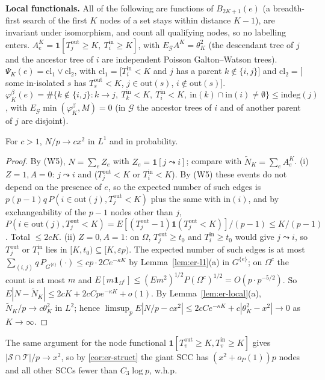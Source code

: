 \textbf{Local functionals.} All of the following are functions of $B_{2K+1}(e)$
(a breadth-first search of the first $K$ nodes of a set stays within distance
$K-1$), are invariant under isomorphism, and count all qualifying nodes, so no
labelling enters.
$A^K_e=\mathbf 1[T^{\mathrm{out}}_j\ge K,\ T^{\mathrm{in}}_i\ge K]$, with
$E_{\mathcal G}A^K=\theta_K^2$ (the descendant tree of $j$ and the ancestor tree
of $i$ are independent Poisson Galton--Watson trees).
$\Psi_K(e)=\mathrm{cl}_1\vee\mathrm{cl}_2$, with
$\mathrm{cl}_1=[T^{\mathrm{in}}_i<K$ and $j$ has a parent $k\notin\{i,j\}]$ and
$\mathrm{cl}_2=[$some in-isolated $s$ has $T^{\mathrm{out}}_s<K$, $j\in\mathrm{out}(s)$, $i\notin\mathrm{out}(s)]$.
$\varphi^{\beta}_K(e)=\#\{k\notin\{i,j\}:k\to j,\ T^{\mathrm{in}}_k<K,\ T^{\mathrm{in}}_i<K,\ \mathrm{in}(k)\cap\mathrm{in}(i)\ne\emptyset\}\le\mathrm{indeg}(j)$,
with $E_{\mathcal G}\min(\varphi^\beta_K,M)=0$ (in $\mathcal G$ the ancestor trees
of $i$ and of another parent of $j$ are disjoint).

\begin{proposition}[$L$, $c>1$]\label{prop:er-N}
For $c>1$, $N/p\to cx^2$ in $L^1$ and in probability.
\end{proposition}
\begin{proof}
By (W5), $N=\sum_eZ_e$ with $Z_e=\mathbf 1[j\leadsto i]$; compare with
$\tilde N_K=\sum_eA^K_e$.
(i) $Z=1,A=0$: $j\leadsto i$ and ($T^{\mathrm{out}}_j<K$ or $T^{\mathrm{in}}_i<K$).
By (W5) these events do not depend on the presence of $e$, so the expected
number of such edges is $p(p-1)q\,P(i\in\mathrm{out}(j),T^{\mathrm{out}}_j<K)$ plus
the same with $\mathrm{in}(i)$, and by exchangeability of the $p-1$ nodes other
than $j$, $P(i\in\mathrm{out}(j),T^{\mathrm{out}}_j<K)=E[(T^{\mathrm{out}}_j-1)\mathbf 1(T^{\mathrm{out}}_j<K)]/(p-1)\le K/(p-1)$.
Total $\le2cK$.
(ii) $Z=0,A=1$: on $\Omega$, $T^{\mathrm{out}}_j\ge t_0$ and $T^{\mathrm{in}}_i\ge t_0$
would give $j\leadsto i$, so $T^{\mathrm{out}}_j$ or $T^{\mathrm{in}}_i$ lies in
$[K,t_0)\subseteq[K,\varepsilon p)$. The expected number of such edges is at
most $\sum_{(i,j)}q\,P_{G^{\{e\}}}(\cdot)\le cp\cdot2Ce^{-\kappa K}$ by
Lemma~\ref{lem:er-l1}(a) in $G^{\{e\}}$; on $\Omega^c$ the count is at most $m$
and $E[m\mathbf 1_{\Omega^c}]\le(Em^2)^{1/2}P(\Omega^c)^{1/2}=O(p\cdot p^{-5/2})$.
So $E|N-\tilde N_K|\le2cK+2cCpe^{-\kappa K}+o(1)$. By
Lemma~\ref{lem:er-local}(a), $\tilde N_K/p\to c\theta_K^2$ in $L^2$; hence
$\limsup_pE|N/p-cx^2|\le2cCe^{-\kappa K}+c|\theta_K^2-x^2|\to0$ as $K\to\infty$.
\end{proof}
The same argument for the node functional $\mathbf 1[T^{\mathrm{out}}_v\ge K,T^{\mathrm{in}}_v\ge K]$
gives $|\mathcal S\cap\mathcal T|/p\to x^2$, so by \cref{cor:er-struct} the giant
SCC has $(x^2+o_P(1))p$ nodes and all other SCCs fewer than $C_3\log p$, w.h.p.

